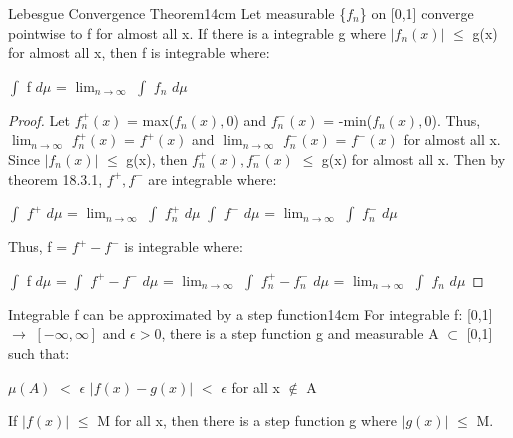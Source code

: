    \begin{wtheorem}{Lebesgue Convergence Theorem}{14cm}
        Let measurable \{$f_n$\} on [0,1] converge pointwise to f
        for almost all x. If there is a integrable g where
        $|f_n(x)|$ $\leq$ g(x) for almost all x, then f is integrable where:

        \hspace{0.5cm}
        $\int$ f $d\mu$ = $\lim_{n \rightarrow \infty}$ $\int$ $f_n$ $d\mu$
    \end{wtheorem}

    \begin{proof}
        Let $f_n^+(x)$ = max($f_n(x),0$) and $f_n^-(x)$ = -min($f_n(x),0$).
        Thus, $\lim_{n \rightarrow \infty}$ $f_n^+(x)$ = $f^+(x)$
        and $\lim_{n \rightarrow \infty}$ $f_n^-(x)$ = $f^-(x)$
        for almost all x.
        Since $|f_n(x)|$ $\leq$ g(x), then
        $f_n^+(x),f_n^-(x)$ $\leq$ g(x) for almost all x.
        Then by {\color{red} theorem 18.3.1}, $f^+,f^-$ are integrable where:

        \hspace{0.5cm}
        $\int$ $f^+$ $d\mu$
        = $\lim_{n \rightarrow \infty}$ $\int$ $f_n^+$ $d\mu$
        \hspace{1cm}
        $\int$ $f^-$ $d\mu$
        = $\lim_{n \rightarrow \infty}$ $\int$ $f_n^-$ $d\mu$

        Thus, f = $f^+ - f^-$ is integrable where:

        \hspace{0.5cm}
        $\int$ f $d\mu$
        = $\int$ $f^+ - f^-$ $d\mu$
        = $\lim_{n \rightarrow \infty}$ $\int$ $f_n^+ - f_n^-$ $d\mu$
        = $\lim_{n \rightarrow \infty}$ $\int$ $f_n$ $d\mu$
    \end{proof}

    \newpage



    \begin{wtheorem}{Integrable f can be approximated by a step function}{14cm}
        For integrable f: [0,1] $\rightarrow$ $[-\infty,\infty]$
        and $\epsilon > 0$, there is a step function g
        and measurable A $\subset$ [0,1] such that:
        
        \hspace{0.5cm}
        $\mu(A)$ $<$ $\epsilon$
        \hspace{1cm}
        $|f(x) - g(x)|$ $<$ $\epsilon$
        for all x $\not \in$ A

        If $|f(x)|$ $\leq$ M for all x, then
        there is a step function g where $|g(x)|$ $\leq$ M.
    \end{wtheorem}


